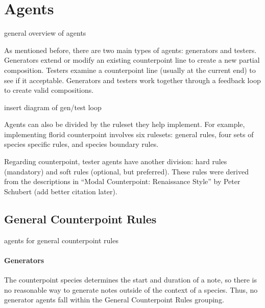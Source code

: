\section{Agents}

general overview of agents

As mentioned before, there are two main types of agents: generators and testers.
Generators extend or modify an existing counterpoint line to create a new partial composition.
Testers examine a counterpoint line (usually at the current end) to see if it acceptable.
Generators and testers work together through a feedback loop to create valid compositions.

insert diagram of gen/test loop

Agents can also be divided by the ruleset they help implement.
For example, implementing florid counterpoint involves six rulesets: general rules, four sets of species specific rules, and species boundary rules.

Regarding counterpoint, tester agents have another division: hard rules (mandatory) and soft rules (optional, but preferred).
These rules were derived from the descriptions in ``Modal Counterpoint: Renaissance Style'' by Peter Schubert (add better citation later).

\subsection{General Counterpoint Rules}

agents for general counterpoint rules
\paragraph{Generators}
The counterpoint species determines the start and duration of a note, so there is no reasonable way to generate notes outside of the context of a species.
Thus, no generator agents fall within the General Counterpoint Rules grouping.

